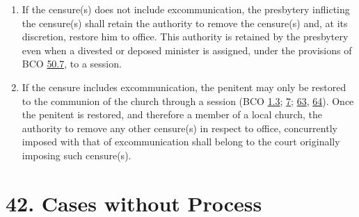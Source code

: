 \documentclass[
]{book}
\providecommand{\tightlist}{%
  \setlength{\itemsep}{0pt}\setlength{\parskip}{0pt}}
\begin{document}
\begin{enumerate}
  \begin{enumerate}
  \def\labelenumii{\alph{enumii}.}
  \tightlist
  \item
    If the censure(s) does not include excommunication, the presbytery inflicting the censure(s) shall retain the authority to remove the censure(s) and, at its discretion, restore him to office. This authority is retained by the presbytery even when a divested or deposed minister is assigned, under the provisions of BCO \protect\hyperlink{50.7}{50.7}, to a session.
  \item
    If the censure includes excommunication, the penitent may only be restored to the communion of the church through a session (BCO \protect\hyperlink{1.3}{1.3}; \protect\hyperlink{7}{7}; \protect\hyperlink{63}{63}, \protect\hyperlink{64}{64}). Once the penitent is restored, and therefore a member of a local church, the authority to remove any other censure(s) in respect to office, concurrently imposed with that of excommunication shall belong to the court originally imposing such censure(s).
  \end{enumerate}
\end{enumerate}

\hypertarget{cases-without-process}{%
\section*{42. Cases without Process}\label{cases-without-process}}

\protect\hypertarget{chapter-slug-42-cases-without-process}{\href{}{}}
\end{document}
